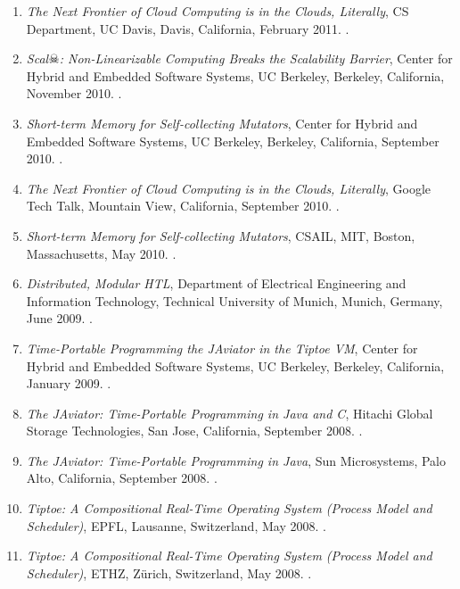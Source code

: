 {\begin{enumerate}
\item \emph{The Next Frontier of Cloud Computing is in the Clouds, Literally}, CS Department, UC Davis, Davis, California, February 2011.
.

\item \emph{Scal$\skull$: Non-Linearizable Computing Breaks the Scalability Barrier},
Center for Hybrid and Embedded Software Systems, UC Berkeley, Berkeley, California, November 2010.
.

\item \emph{Short-term Memory for Self-collecting Mutators},
Center for Hybrid and Embedded Software Systems, UC Berkeley, Berkeley, California, September 2010.
.

\item \emph{The Next Frontier of Cloud Computing is in the Clouds, Literally}, Google Tech Talk, Mountain View, California, September 2010.
.

\item \emph{Short-term Memory for Self-collecting Mutators}, CSAIL, MIT, Boston, Massachusetts, May 2010.
.

\item \emph{Distributed, Modular HTL},
Department of Electrical Engineering and Information Technology, Technical University of Munich, Munich, Germany, June 2009.
.

\item \emph{Time-Portable Programming the JAviator in the Tiptoe VM},
Center for Hybrid and Embedded Software Systems, UC Berkeley, Berkeley, California, January 2009.
.

\item \emph{The JAviator: Time-Portable Programming in Java and C},
Hitachi Global Storage Technologies, San Jose, California, September 2008.
.

\item \emph{The JAviator: Time-Portable Programming in Java},
Sun Microsystems, Palo Alto, California, September 2008.
.

\item \emph{Tiptoe: A Compositional Real-Time Operating System (Process Model and Scheduler)},
EPFL, Lausanne, Switzerland, May 2008.
.

\item \emph{Tiptoe: A Compositional Real-Time Operating System (Process Model and Scheduler)},
ETHZ, Z{\"u}rich, Switzerland, May 2008.
.


\end{enumerate}}
